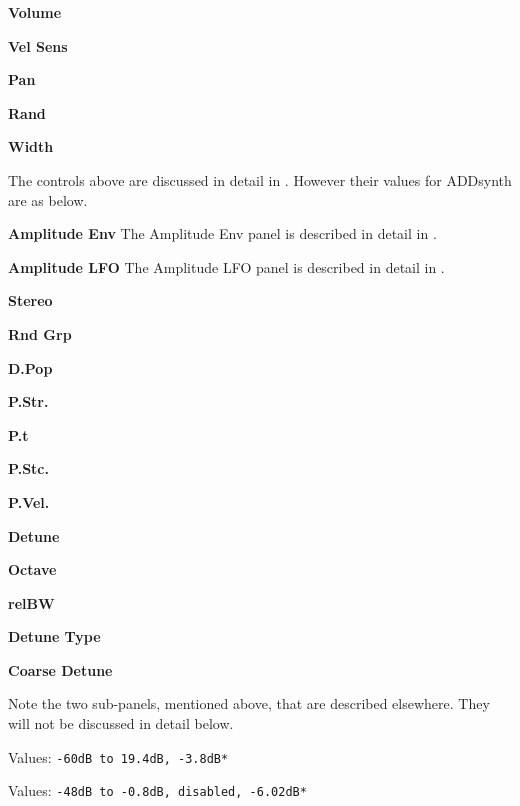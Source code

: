    \begin{enumber}
      \item \textbf{Volume}
      \item \textbf{Vel Sens}
      \item \textbf{Pan}
      \item \textbf{Rand}
      \item \textbf{Width}

       The controls above are discussed in detail in
       . However their values for ADDsynth
       are as below.

      \item \textbf{Amplitude Env}
         The Amplitude Env panel is described in detail in
         .
      \item \textbf{Amplitude LFO}
         The Amplitude LFO panel is described in detail in
         .

      \item \textbf{Stereo}
      \item \textbf{Rnd Grp}
      \item \textbf{D.Pop}
      \item \textbf{P.Str.}
      \item \textbf{P.t}
      \item \textbf{P.Stc.}
      \item \textbf{P.Vel.}
      \item \textbf{Detune}
      \item \textbf{Octave}
      \item \textbf{relBW}
      \item \textbf{Detune Type}
      \item \textbf{Coarse Detune}
   \end{enumber}

   Note the two sub-panels, mentioned above, that are described elsewhere.
   They will not be discussed in detail below.

   \setcounter{ItemCounter}{0}      %


   Values: \texttt{-60dB to 19.4dB, -3.8dB*}


   Values: \texttt{-48dB to -0.8dB, disabled, -6.02dB*}

